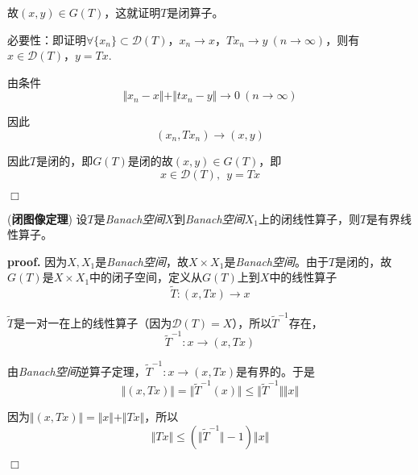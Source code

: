 故$(x,y)\in G(T)$，这就证明$T$是闭算子。

必要性：即证明$\forall \{x_n\}\subset \mathcal{D}(T)$，$x_n\rightarrow x$，$Tx_n\rightarrow y\ (n\rightarrow \infty)$，则有$x\in \mathcal{D}(T)$，$y=Tx$.

由条件
\begin{equation}
    \Vert x_n-x\Vert+\Vert tx_n-y\Vert \rightarrow 0\ (n\rightarrow \infty)
\end{equation}

因此
\begin{equation}
    (x_n,Tx_n)\rightarrow (x,y)
\end{equation}

因此$T$是闭的，即$G(T)$是闭的故$(x,y)\in G(T)$，即
\begin{equation}
    x\in \mathcal{D}(T),\ \ y=Tx
\end{equation}

$\Box$

\begin{mdframed}
    \begin{theorem}
        (\textbf{闭图像定理}) 设$T$是\textsl{Banach空间}$X$到\textsl{Banach空间}$X_1$上的闭线性算子，则$T$是有界线性算子。
    \end{theorem}
\end{mdframed}

\textbf{proof.}\hspace*{0.5em} 因为$X,X_1$是\textsl{Banach空间}，故$X\times X_1$是\textsl{Banach空间}。由于$T$是闭的，故$G(T)$是$X\times X_1$中的闭子空间，定义从$G(T)$上到$X$中的线性算子
\begin{equation}
    \tilde{T}:(x,Tx)\rightarrow x
\end{equation}

$\tilde{T}$是一对一在上的线性算子（因为$\mathcal{D}(T)=X$），所以$\tilde{T}^{-1}$存在，
\begin{equation}
    \tilde{T}^{-1}:x\rightarrow (x,Tx)
\end{equation}

由\textsl{Banach空间}逆算子定理，$\tilde{T}^{-1}:x\rightarrow (x,Tx)$是有界的。于是
\begin{equation}
    \Vert (x,Tx)\Vert=\Vert \tilde{T}^{-1}(x)\Vert\leqslant \Vert \tilde{T}^{-1}\Vert \Vert x\Vert
\end{equation}

因为$\Vert (x,Tx)\Vert=\Vert x\Vert+\Vert Tx\Vert$，所以
\begin{equation}
    \Vert Tx\Vert\leqslant (\Vert \tilde{T}^{-1}\Vert - 1)\Vert x\Vert
\end{equation}

$\Box$